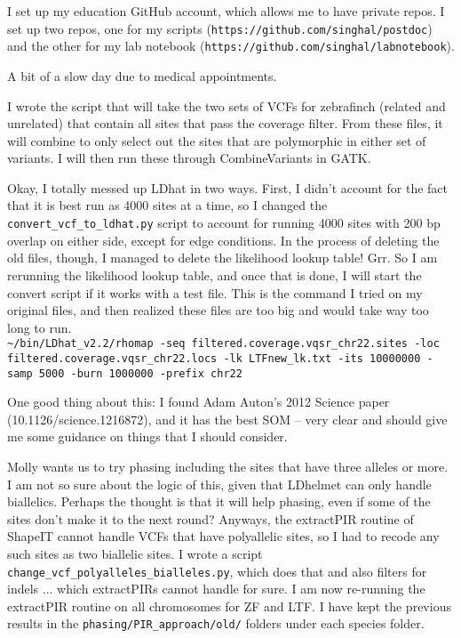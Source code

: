 \documentclass[idxtotoc,hyperref,openany,oneside]{labbook} %
\begin{document}
I set up my education GitHub account, which allows me to have private repos. I set up two repos, one for my scripts (\texttt{https://github.com/singhal/postdoc}) and the other for my lab notebook (\texttt{https://github.com/singhal/labnotebook}).


A bit of a slow day due to medical appointments.

I wrote the script that will take the two sets of VCFs for zebrafinch (related and unrelated) that contain all sites that pass the coverage filter. From these files, it will combine to only select out the sites that are polymorphic in either set of variants. I will then run these through CombineVariants in GATK.

Okay, I totally messed up LDhat in two ways. First, I didn't account for the fact that it is best run as 4000 sites at a time, so I changed the \verb+convert_vcf_to_ldhat.py+ script to account for running 4000 sites with 200 bp overlap on either side, except for edge conditions. In the process of deleting the old files, though, I managed to delete the likelihood lookup table! Grr. So I am rerunning the likelihood lookup table, and once that is done, I will start the convert script if it works with a test file. This is the command I tried on my original files, and then realized these files are too big and would take way too long to run. \\
\verb+~/bin/LDhat_v2.2/rhomap -seq filtered.coverage.vqsr_chr22.sites -loc filtered.coverage.vqsr_chr22.locs -lk LTFnew_lk.txt -its 10000000 -samp 5000 -burn 1000000 -prefix chr22+

One good thing about this: I found Adam Auton's 2012 Science paper (10.1126/science.1216872), and it has the best SOM -- very clear and should give me some guidance on things that I should consider.


Molly wants us to try phasing including the sites that have three alleles or more. I am not so sure about the logic of this, given that LDhelmet can only handle biallelics. Perhaps the thought is that it will help phasing, even if some of the sites don't make it to the next round? Anyways, the extractPIR routine of ShapeIT cannot handle VCFs that have polyallelic sites, so I had to recode any such sites as two biallelic sites. I wrote a script \verb+change_vcf_polyalleles_bialleles.py+, which does that and also filters for indels ... which extractPIRs cannot handle for sure. I am now re-running the extractPIR routine on all chromosomes for ZF and LTF. I have kept the previous results in the \verb+phasing/PIR_approach/old/+ folders under each species folder. \\
\end{document}
